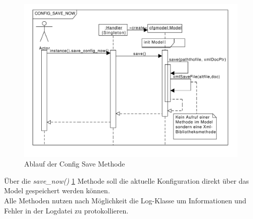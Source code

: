 \begin{figure}[htb!]
	\centering
  	\includegraphics[width=\textwidth]{configSave.pdf}
	\caption{Ablauf der Config Save Methode}
	\label{c_configsave}
\end{figure}


Über die \emph{save\_now()} \ref{c_configsave} Methode soll die aktuelle Konfiguration direkt über das Model gespeichert werden können.
\\
Alle Methoden nutzen nach Möglichkeit die Log-Klasse um Informationen und Fehler in der Logdatei zu protokollieren.

\newpage


